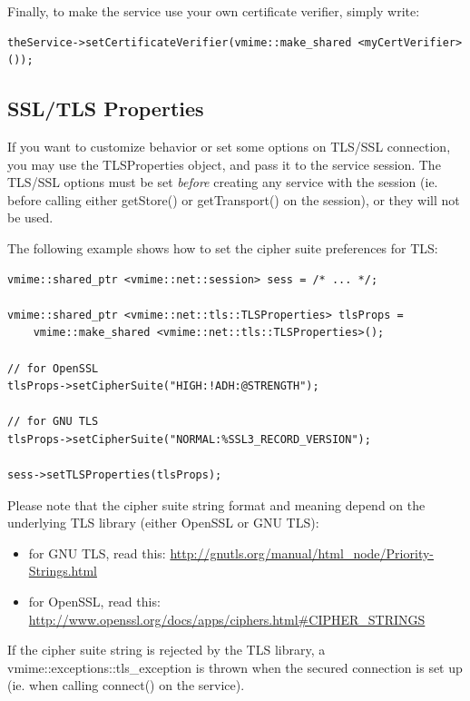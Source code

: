 Finally, to make the service use your own certificate verifier, simply write:

\begin{lstlisting}
theService->setCertificateVerifier(vmime::make_shared <myCertVerifier>());
\end{lstlisting}

\subsection{SSL/TLS Properties} %

If you want to customize behavior or set some options on TLS/SSL connection,
you may use the TLSProperties object, and pass it to the service session. The
TLS/SSL options must be set {\em before} creating any service with the session
(ie. before calling either {\vcode getStore()} or {\vcode getTransport()} on
the session), or they will not be used.

The following example shows how to set the cipher suite preferences for TLS:

\begin{lstlisting}[caption={Setting TLS cipher suite preferences}]
vmime::shared_ptr <vmime::net::session> sess = /* ... */;

vmime::shared_ptr <vmime::net::tls::TLSProperties> tlsProps =
	vmime::make_shared <vmime::net::tls::TLSProperties>();

// for OpenSSL
tlsProps->setCipherSuite("HIGH:!ADH:@STRENGTH");

// for GNU TLS
tlsProps->setCipherSuite("NORMAL:%SSL3_RECORD_VERSION");

sess->setTLSProperties(tlsProps);
\end{lstlisting}

Please note that the cipher suite string format and meaning depend on the
underlying TLS library (either OpenSSL or GNU TLS):

\begin{itemize}
\item for GNU TLS, read this: \newline
\url{http://gnutls.org/manual/html\_node/Priority-Strings.html}

\item for OpenSSL, read this: \newline
\url{http://www.openssl.org/docs/apps/ciphers.html#CIPHER\_STRINGS}
\end{itemize}

If the cipher suite string is rejected by the TLS library, a
{\vcode vmime::exceptions::tls\_exception} is thrown when the secured
connection is set up (ie. when calling {\vcode connect()} on the service).

